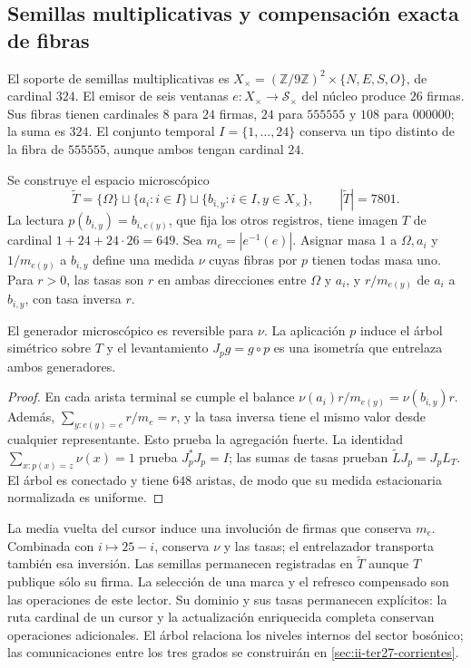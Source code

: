 \subsection{Semillas multiplicativas y compensación exacta de fibras}
\label{sec:ii-ter27-fibras}

El soporte de semillas multiplicativas es
$X_\times=(\mathbb Z/9\mathbb Z)^2\times\{N,E,S,O\}$, de cardinal
$324$. El emisor de seis ventanas $e:X_\times\to\mathcal S_\times$
del núcleo produce $26$ firmas. Sus fibras tienen cardinales $8$ para
$24$ firmas, $24$ para $555555$ y $108$ para $000000$; la suma es $324$.
El conjunto temporal $I=\{1,\ldots,24\}$ conserva un tipo distinto de la
fibra de $555555$, aunque ambos tengan cardinal $24$.

Se construye el espacio microscópico
\[
 \widetilde T=\{\Omega\}\sqcup\{a_i:i\in I\}
 \sqcup\{b_{i,y}:i\in I,y\in X_\times\},\qquad |\widetilde T|=7801.
\]
La lectura $p(b_{i,y})=b_{i,e(y)}$, que fija los otros registros, tiene
imagen $T$ de cardinal $1+24+24\cdot26=649$. Sea $m_e=|e^{-1}(e)|$.
Asignar masa $1$ a $\Omega,a_i$ y $1/m_{e(y)}$ a $b_{i,y}$ define
una medida $\nu$ cuyas fibras por $p$ tienen todas masa uno. Para
$r>0$, las tasas son $r$ en ambas direcciones entre $\Omega$ y $a_i$,
y $r/m_{e(y)}$ de $a_i$ a $b_{i,y}$, con tasa inversa $r$.

\begin{proposition}
\label{prop:ii-ter27-arbol}
El generador microscópico es reversible para $\nu$. La aplicación $p$
induce el árbol simétrico sobre $T$ y el levantamiento $J_pg=g\circ p$
es una isometría que entrelaza ambos generadores.
\end{proposition}
\begin{proof}
En cada arista terminal se cumple el balance
$\nu(a_i)r/m_{e(y)}=\nu(b_{i,y})r$. Además,
$\sum_{y:e(y)=e}r/m_e=r$, y la tasa inversa tiene el mismo valor desde
cualquier representante. Esto prueba la agregación fuerte. La identidad
$\sum_{x:p(x)=z}\nu(x)=1$ prueba $J_p^*J_p=I$; las sumas de tasas
prueban $\widetilde L J_p=J_pL_T$. El árbol es conectado y tiene
$648$ aristas, de modo que su medida estacionaria normalizada es uniforme.
\end{proof}
La media vuelta del cursor induce una involución de firmas que conserva
$m_e$. Combinada con $i\mapsto25-i$, conserva $\nu$ y las tasas; el
entrelazador transporta también esa inversión. Las semillas permanecen
registradas en $\widetilde T$ aunque $T$ publique sólo su firma.
La selección de una marca y el refresco compensado son las operaciones
de este lector. Su dominio y sus tasas permanecen explícitos: la ruta
cardinal de un cursor y la actualización enriquecida completa conservan
operaciones adicionales. El árbol relaciona los niveles internos del
sector bosónico; las comunicaciones entre los tres grados se construirán
en \ref{sec:ii-ter27-corrientes}.

